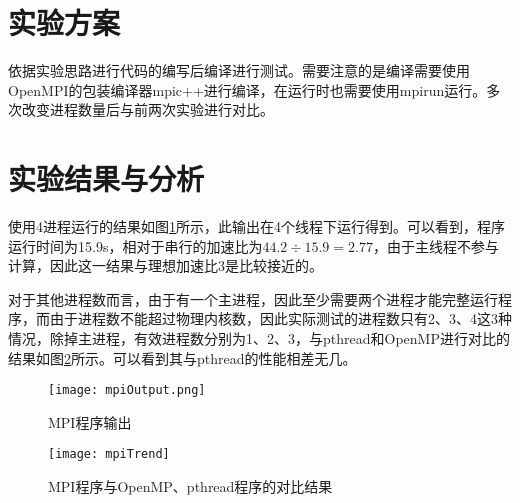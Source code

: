 \section{实验方案}
\par 依据实验思路进行代码的编写后编译进行测试。需要注意的是编译需要使用OpenMPI的包装编译器mpic++进行编译，在运行时也需要使用mpirun运行。多次改变进程数量后与前两次实验进行对比。

\section{实验结果与分析}
\par 使用4进程运行的结果如图\ref{fig:mpiOutput}所示，此输出在4个线程下运行得到。可以看到，程序运行时间为15.9s，相对于串行的加速比为\(44.2\div 15.9 = 2.77\)，由于主线程不参与计算，因此这一结果与理想加速比3是比较接近的。
\par 对于其他进程数而言，由于有一个主进程，因此至少需要两个进程才能完整运行程序，而由于进程数不能超过物理内核数，因此实际测试的进程数只有2、3、4这3种情况，除掉主进程，有效进程数分别为1、2、3，与pthread和OpenMP进行对比的结果如图\ref{fig:mpiTrend}所示。可以看到其与pthread的性能相差无几。

\begin{figure}[htpb]
    \centering
    \texttt{[image: mpiOutput.png]}
    \caption{MPI程序输出}
    \label{fig:mpiOutput}
\end{figure}

\begin{figure}[htpb]
    \centering
    \texttt{[image: mpiTrend]}
    \caption{MPI程序与OpenMP、pthread程序的对比结果}
    \label{fig:mpiTrend}
\end{figure}


